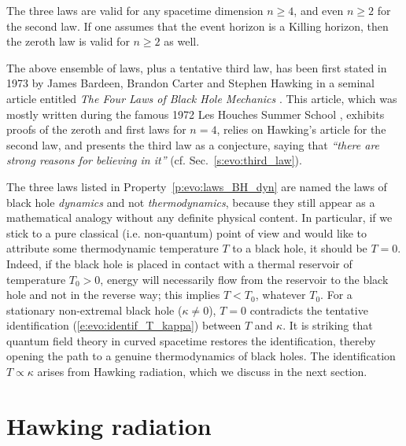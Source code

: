 \begin{remark}
The three laws are valid for any spacetime dimension $n\geq 4$, and even
$n\geq 2$ for the second law. If one assumes that the event horizon is a Killing
horizon, then the zeroth law is valid for $n\geq 2$ as well.
\end{remark}

\begin{hist}
The above ensemble of laws, plus a tentative third law, has been first stated in 1973 by
James Bardeen, Brandon Carter
and Stephen Hawking in a seminal article
entitled \emph{The Four Laws of Black Hole Mechanics} \cite{BardeCH73}. This
article, which was mostly written during the famous 1972 Les Houches Summer School \cite{DeWit73}, exhibits proofs of the zeroth and first laws for $n=4$,
relies on Hawking's article \cite{Hawki72} for the second law, and presents
the third law as a conjecture, saying that \emph{``there are strong reasons for believing in it''}
(cf. Sec.~\ref{s:evo:third_law}).
\end{hist}

The three laws listed in Property~\ref{p:evo:laws_BH_dyn} are named the laws of black hole \emph{dynamics} and not \emph{thermodynamics}, because they still appear as a mathematical analogy without any definite physical content. In particular, if we stick to a
pure classical (i.e. non-quantum) point of view and would like to attribute some
thermodynamic temperature $T$ to a black hole, it should be $T=0$. Indeed, if the black hole is placed in contact with a thermal reservoir of temperature $T_0>0$, energy will necessarily flow from the reservoir to the black hole and not in the reverse way; this implies $T<T_0$, whatever $T_0$.
For a stationary non-extremal black hole ($\kappa\neq 0$), $T=0$ contradicts the tentative identification (\ref{e:evo:identif_T_kappa}) between $T$ and $\kappa$.
It is striking that quantum field theory in curved spacetime
restores the identification, thereby opening the path to a genuine thermodynamics of
black holes. The identification $T\propto \kappa$ arises from Hawking radiation,
which we discuss in the next section.


\section{Hawking radiation}

